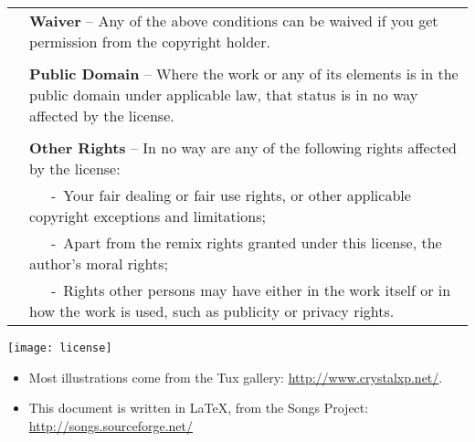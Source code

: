 \begin{tabular}{p{1cm} p{12cm}}
  \\
  & \textbf{Waiver} --
  Any of the above conditions can be waived if you get permission 
  from the copyright holder. \\
  \\
  & \textbf{Public Domain} -- 
  Where the work or any of its elements is in the public domain 
  under applicable law, that status is in no way affected by the license. \\
  \\
  & \textbf{Other Rights} -- 
  In no way are any of the following rights affected by the license: \\
  & ~~~-~Your fair dealing or fair use rights, or other applicable 
  copyright exceptions and limitations;\\
  & ~~~-~Apart from the remix rights granted under this license, 
  the author's moral rights;\\
  & ~~~-~Rights other persons may have either in the work itself 
  or in how the work is used, such as publicity or privacy rights.\\
\end{tabular}

\vspace{0.5cm}
\begin{center}
  \texttt{[image: license]}
\end{center}
\vspace{0.5cm}

\begin{itemize}
\item Most illustrations come from the Tux gallery: \url{http://www.crystalxp.net/}.
\item This document is written in \LaTeX, 
  from the Songs Project: \url{http://songs.sourceforge.net/}
\end{itemize}


